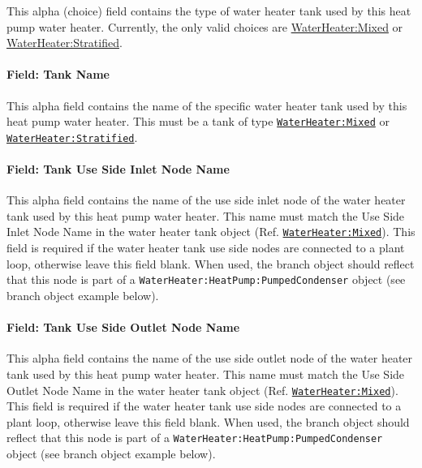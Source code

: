 This alpha (choice) field contains the type of water heater tank used by this heat pump water heater. Currently, the only valid choices are \hyperref[waterheatermixed]{WaterHeater:Mixed} or \hyperref[waterheaterstratified]{WaterHeater:Stratified}.

\paragraph{Field: Tank Name}\label{field-tank-name-000}

This alpha field contains the name of the specific water heater tank used by this heat pump water heater. This must be a tank of type \hyperref[waterheatermixed]{\lstinline!WaterHeater:Mixed!} or \hyperref[waterheaterstratified]{\lstinline!WaterHeater:Stratified!}.

\paragraph{Field: Tank Use Side Inlet Node Name}\label{field-tank-use-side-inlet-node-name}

This alpha field contains the name of the use side inlet node of the water heater tank used by this heat pump water heater. This name must match the Use Side Inlet Node Name in the water heater tank object (Ref. \hyperref[waterheatermixed]{\lstinline!WaterHeater:Mixed!}). This field is required if the water heater tank use side nodes are connected to a plant loop, otherwise leave this field blank. When used, the branch object should reflect that this node is part of a \lstinline!WaterHeater:HeatPump:PumpedCondenser! object (see branch object example below).

\paragraph{Field: Tank Use Side Outlet Node Name}\label{field-tank-use-side-outlet-node-name}

This alpha field contains the name of the use side outlet node of the water heater tank used by this heat pump water heater. This name must match the Use Side Outlet Node Name in the water heater tank object (Ref. \hyperref[waterheatermixed]{\lstinline!WaterHeater:Mixed!}). This field is required if the water heater tank use side nodes are connected to a plant loop, otherwise leave this field blank. When used, the branch object should reflect that this node is part of a \lstinline!WaterHeater:HeatPump:PumpedCondenser! object (see branch object example below).


